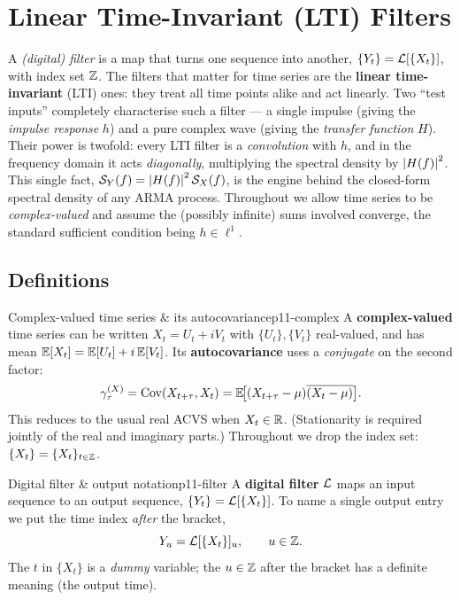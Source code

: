\section{Linear Time-Invariant (LTI) Filters}
\label{sec:lti}

A \emph{(digital) filter} is a map that turns one sequence into another,
$\{Y_t\}=\mathcal{L}[\{X_t\}]$, with index set $\mathbb{Z}$. The filters that matter for
time series are the \textbf{linear time-invariant} (LTI) ones: they treat all
time points alike and act linearly. Two ``test inputs'' completely characterise
such a filter --- a single impulse (giving the \emph{impulse response} $h$) and
a pure complex wave (giving the \emph{transfer function} $H$). Their power is
twofold: every LTI filter is a \emph{convolution} with $h$, and in the frequency
domain it acts \emph{diagonally}, multiplying the spectral density by
$\left\lvert H(f) \right\rvert^2$. This single fact, $\mathcal{S}_Y(f)=\left\lvert H(f) \right\rvert^2\mathcal{S}_X(f)$, is the
engine behind the closed-form spectral density of any ARMA process. Throughout
we allow time series to be \emph{complex-valued} and assume the (possibly
infinite) sums involved converge, the standard sufficient condition being
$h\in\ell^1$.

\subsection{Definitions}

\begin{definition}{Complex-valued time series \& its autocovariance}{p11-complex}
A \textbf{complex-valued} time series can be written $X_t=U_t+iV_t$ with
$\{U_t\},\{V_t\}$ real-valued, and has mean
$\mathbb{E}[X_t]=\mathbb{E}[U_t]+i\,\mathbb{E}[V_t]$. Its \textbf{autocovariance} uses a
\emph{conjugate} on the second factor:
\[
\gamma^{(X)}_\tau=\operatorname{Cov}(X_{t+\tau},X_t)=\mathbb{E}\!\big[(X_{t+\tau}-\mu)\overline{(X_t-\mu)}\big].
\]
This reduces to the usual real ACVS when $X_t\in\mathbb{R}$. (Stationarity is
required jointly of the real and imaginary parts.) Throughout we drop the index
set: $\{X_t\}=\{X_t\}_{t\in\mathbb{Z}}$.
\end{definition}

\begin{definition}{Digital filter \& output notation}{p11-filter}
A \textbf{digital filter} $\mathcal{L}$ maps an input sequence to an output sequence,
$\{Y_t\}=\mathcal{L}[\{X_t\}]$. To name a single output entry we put the time index
\emph{after} the bracket,
\[
Y_u=\mathcal{L}[\{X_t\}]_u,\qquad u\in\mathbb{Z} .
\]
The $t$ in $\{X_t\}$ is a \emph{dummy} variable; the $u\in\mathbb{Z}$ after the
bracket has a definite meaning (the output time).
\end{definition}

